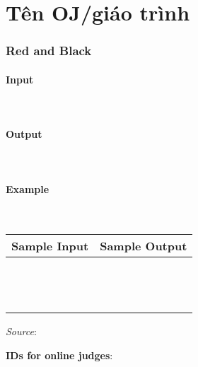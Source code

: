 
\section{Tên OJ/giáo trình}

\subsubsection{Red and Black}
 

\paragraph{Input} \mbox{} \\



\paragraph{Output}\mbox{} \\


\paragraph{Example}\mbox{} \\

\begin{table}[h]
    \centering
    \begin{tabular}{|l|r|}
        \hline
        \textbf{Sample Input} & \textbf{Sample Output} \\
        \hline
		&  \\ 
		&  \\ 
		&  \\ 
		&  \\ 
		&  \\
		&  \\ 
		&  \\ 
		&  \\ 
		&  \\ 
		&  \\ 
		&  \\ 
		&  \\
		&  \\ \hline
    \end{tabular}
\end{table}

\textit{Source}: 

\textbf{IDs for online judges}:

